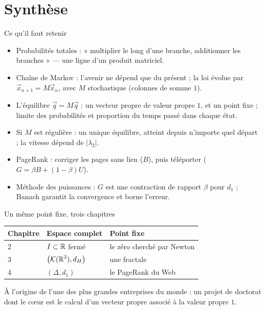 \section{Synthèse}

\begin{frame}{Ce qu'il faut retenir}
  \small
  \begin{itemize}
    \item Probabilités totales : « multiplier le long d'une branche,
      additionner les branches » --- une ligne d'un produit matriciel.
    \item Chaîne de Markov : l'avenir ne dépend que du présent ; la loi
      évolue par $\vec x_{n+1}=M\vec x_n$, avec $M$ stochastique (colonnes
      de somme $1$).
    \item L'équilibre $\vec q=M\vec q$ : un vecteur propre de valeur
      propre $1$, et un point fixe ; limite des probabilités et proportion
      du temps passé dans chaque état.
    \item Si $M$ est régulière : un unique équilibre, atteint depuis
      n'importe quel départ ; la vitesse dépend de $|\lambda_2|$.
    \item PageRank : corriger les pages sans lien ($B$), puis téléporter
      ($G=\beta B+(1-\beta)U$).
    \item Méthode des puissances : $G$ est une contraction de rapport
      $\beta$ pour $d_1$ ; Banach garantit la convergence et borne
      l'erreur.
  \end{itemize}
\end{frame}

\begin{frame}{Un même point fixe, trois chapitres}
  \small
  \begin{center}
  \begin{tabular}{lll}
    \toprule
    Chapitre & Espace complet & Point fixe \\
    \midrule
    2 & $I\subset\operatorname{\mathbb{R}}$ fermé & le zéro cherché par Newton \\
    3 & $\big(\mathcal{K}(\operatorname{\mathbb{R}}^2),d_H\big)$ & une fractale \\
    4 & $(\Delta,d_1)$ & le PageRank du Web \\
    \bottomrule
  \end{tabular}
  \end{center}
  \vspace{6pt}
  À l'origine de l'une des plus grandes entreprises du monde : un projet
  de doctorat dont le cœur est le calcul d'un vecteur propre associé à la
  valeur propre $1$.
\end{frame}

